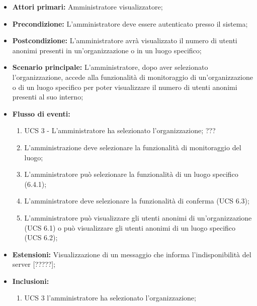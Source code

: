 \begin{itemize}
\item \textbf{Attori primari:} Amministratore visualizzatore;
\item \textbf{Precondizione:} L'amministratore deve essere autenticato presso il sistema;
\item \textbf{Postcondizione:} L'amministratore avrà visualizzato il numero di utenti anonimi presenti in un'organizzazione o in un luogo specifico;
\item \textbf{Scenario principale:} L'amministratore, dopo aver selezionato l'organizzazione, accede alla funzionalità di monitoraggio di un'organizzazione o di un luogo specifico per poter visualizzare il numero di utenti anonimi presenti al suo interno;
\item \textbf{Flusso di eventi:}
\begin{enumerate}
	\item UCS 3 - L'amministratore ha selezionato l'organizzazione; ???
	\item L'amministrazione deve selezionare la funzionalità di monitoraggio del luogo;
	\item L'amministratore può selezionare la funzionalità di un luogo specifico (6.4.1);
	\item L'amministratore deve selezionare la funzionalità di conferma (UCS 6.3);
	\item L'amministratore può visualizzare gli utenti anonimi di un'organizzazione (UCS 6.1) o può visualizzare gli utenti anonimi di un luogo specifico (UCS 6.2);
\end{enumerate}
\item \textbf{Estensioni:}  Visualizzazione di un messaggio che informa l’indisponibilità del server [?????];
\item \textbf{Inclusioni:}
\begin{enumerate}
	\item UCS 3 l'amministratore ha selezionato l'organizzazione;
\end{enumerate}
\end{itemize}

